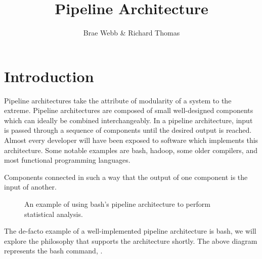 \title{Pipeline Architecture}
\author{Brae Webb \& Richard Thomas}
\date{}

\maketitle

\section{Introduction}

Pipeline architectures take the attribute of modularity of a system to the extreme.
Pipeline architectures are composed of small well-designed components which can ideally be combined interchangeably.
In a pipeline architecture, input is passed through a sequence of components until the desired output is reached.
Almost every developer will have been exposed to software which implements this architecture.
Some notable examples are bash, hadoop, some older compilers, and most functional programming languages.

\begin{definition}
    Components connected in such a way that the output of one component is the input of another.
\end{definition}


\begin{figure}[ht]
    \centering
{}
\caption{An example of using bash's pipeline architecture to perform statistical analysis.}
\label{fig:bash-example}
\end{figure}

The de-facto example of a well-implemented pipeline architecture is bash,
we will explore the philosophy that supports the architecture shortly.
The above diagram represents the bash command, .

